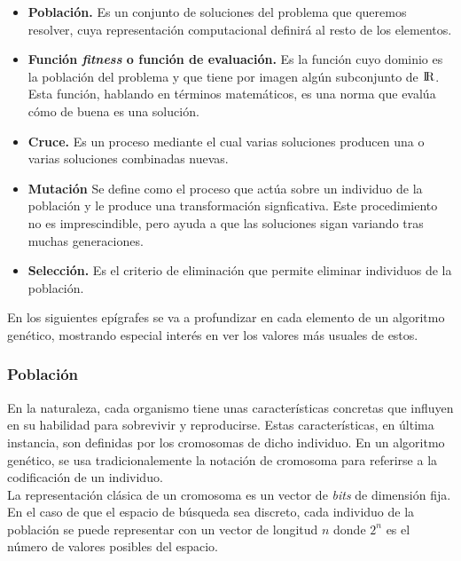 		\begin{itemize}
			\item \textbf{Poblaci\'on.} Es un conjunto de soluciones del problema que queremos resolver, cuya representaci\'on computacional definir\'a al resto de los elementos.
			\item \textbf{Funci\'on \textit{fitness} o funci\'on de evaluaci\'on.} Es la funci\'on cuyo dominio es la poblaci\'on del problema y que tiene por imagen alg\'un subconjunto de ${\rm I\!R}$. Esta funci\'on, hablando en t\'erminos matem\'aticos, es una norma que eval\'ua c\'omo de buena es una soluci\'on.
			\item \textbf{Cruce.} Es un proceso mediante el cual varias soluciones producen una o varias soluciones combinadas nuevas. 
			\item \textbf{Mutaci\'on} Se define como el proceso que act\'ua sobre un individuo de la poblaci\'on y le produce una transformaci\'on signficativa. Este procedimiento no es imprescindible, pero ayuda a que las soluciones sigan variando tras muchas generaciones.
			\item \textbf{Selecci\'on.} Es el criterio de eliminaci\'on que permite eliminar individuos de la poblaci\'on.
		\end{itemize}
		
		En los siguientes ep\'igrafes se va a profundizar en cada elemento de un algoritmo gen\'etico, mostrando especial inter\'es en ver los valores m\'as usuales de estos.\\
		
			\subsubsection{Poblaci\'on}
			En la naturaleza, cada organismo tiene unas caracter\'isticas concretas que influyen en su habilidad para sobrevivir y reproducirse. Estas caracter\'isticas, en  \'ultima instancia, son definidas por los cromosomas de dicho individuo. En un algoritmo gen\'etico, se usa tradicionalemente la notaci\'on de cromosoma para referirse a la codificaci\'on de un individuo.\\
			
			La representaci\'on cl\'asica de un cromosoma es un vector de \textit{bits} de dimensi\'on fija. \\
			
			En el caso de que el espacio de b\'usqueda sea discreto, cada individuo de la poblaci\'on se puede representar con un vector de longitud $n$ donde $2^n$ es el n\'umero de valores posibles del espacio.\\
			
